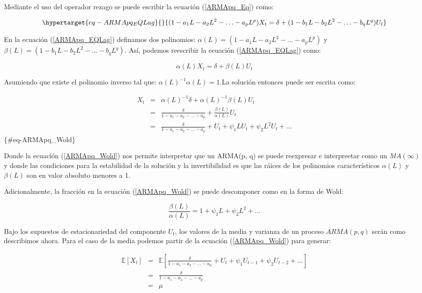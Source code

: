 \documentclass[
  a4paper,
]{article}
\begin{document}
Mediante el uso del operador rezago se puede escribir la ecuación
(\ref{ARMApq_Eq}) como:

\begin{equation}\protect\hypertarget{eq-ARMApq_EQLag}{}{
(1 - a_1 L - a_2 L^2 - \ldots - a_p L^p) X_t = \delta + (1 - b_1 L - b_2 L^2 - \ldots - b_q L^q) U_t 
}\label{eq-ARMApq_EQLag}\end{equation}

En la ecuación (\ref{ARMApq_EQLag}) definamos dos polinomios:
\(\alpha(L) = (1 - a_1 L - a_2 L^2 - \ldots - a_p L^p)\) y
\(\beta(L) = (1 - b_1 L - b_2 L^2 - \ldots - b_q L^q)\). Así, podemos
reescribir la ecuación (\ref{ARMApq_EQLag}) como:

\[
\alpha(L) X_t = \delta + \beta(L) U_t 
\]

Asumiendo que existe el polinomio inverso tal que:
\(\alpha(L)^{-1}\alpha(L) = 1\).La solución entonces puede ser escrita
como:

\begin{eqnarray}
    X_t & = & \alpha(L)^{-1} \delta + \alpha(L)^{-1} \beta(L) U_t \nonumber \\
    & = & \frac{\delta}{1 - a_1 - a_2 - \ldots - a_p} + \frac{\beta(L)}{\alpha(L)} U_t \nonumber \\
    & = & \frac{\delta}{1 - a_1 - a_2 - \ldots - a_p} + U_t + \psi_1 L U_t + \psi_2 L^2 U_t + \ldots
\end{eqnarray} \{\#eq-ARMApq\_Wold\}

Donde la ecuación (\ref{ARMApq_Wold}) nos permite interpretar que un
ARMA(p, q) se puede reexpresar e interpreetar como un \(MA(\infty)\) y
donde las condiciones para la estabilidad de la solución y la
invertibilidad es que las ráices de los polinomios característicos
\(\alpha(L)\) y \(\beta(L)\) son en valor absoluto menores a 1.

Adicionalmente, la fracción en la ecuación (\ref{ARMApq_Wold}) se puede
descomponer como en la forma de Wold:

\[
\frac{\beta(L)}{\alpha(L)} = 1 + \psi_1 L + \psi_2 L^2 + \ldots
\]

Bajo los supuestos de estacionariedad del componente \(U_t\), los
valores de la media y varianza de un proceso \(ARMA(p, q)\) serán como
describimos ahora. Para el caso de la media podemos partir de la
ecuación (\ref{ARMApq_Wold}) para generar:

\begin{eqnarray}
    \mathbb{E}[X_t] & = & \mathbb{E}\left[ \frac{\delta}{1 - a_1 - a_2 - \ldots - a_p} + U_t + \psi_1 U_{t-1} + \psi_2 U_{t-2} + \ldots \right] \nonumber \\
    & = & \frac{\delta}{1 - a_1 - a_2 - \ldots - a_p} \nonumber \\
    & = & \mu
\end{eqnarray}
\end{document}
